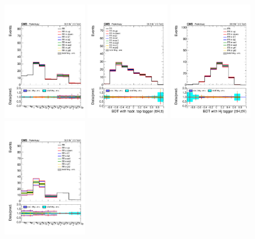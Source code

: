 \begin{figure}[htb]
        \centering 
        \includegraphics[width=0.32\textwidth]{ch9_figs/2lep_mu_catIndex.pdf}
        \includegraphics[width=0.32\textwidth]{ch9_figs/kinMVA_2lss_mu_ttbar_withBDTv8.pdf}
        \includegraphics[width=0.32\textwidth]{ch9_figs/kinMVA_2lss_mu_ttV_withHj.pdf}\\
        \includegraphics[width=0.32\textwidth]{ch9_figs/2lep_e_catIndex.pdf}

\end{figure}
